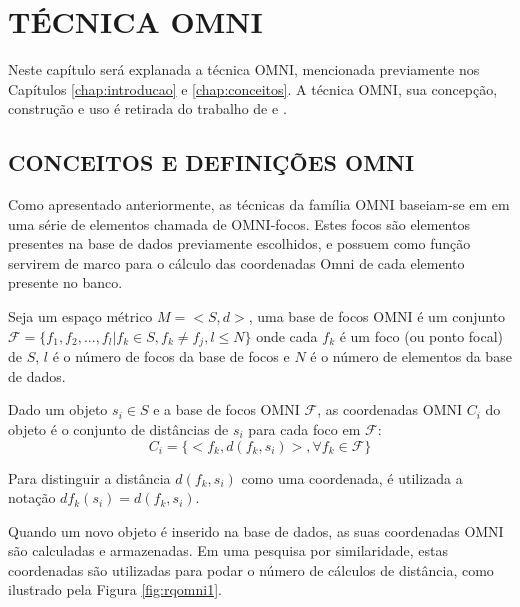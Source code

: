 \chapter{TÉCNICA OMNI}
\label{chap:omni}

Neste capítulo será explanada a técnica OMNI, mencionada previamente nos Capítulos \ref{chap:introducao} e \ref{chap:conceitos}.
A técnica OMNI, sua concepção, construção e uso é retirada do trabalho de \cite{Traina2001} e \cite{Traina2007}.


\section{CONCEITOS E DEFINIÇÕES OMNI}
\label{sec:defomni}
Como apresentado anteriormente, as técnicas da família OMNI baseiam-se em em uma série de elementos chamada de 
OMNI-focos. Estes focos são elementos presentes na base de dados previamente escolhidos, e possuem como função 
servirem de marco para o cálculo das coordenadas Omni de cada elemento presente no banco.

\begin{mydef}
 \label{def:omnifoco}
 Seja um espaço métrico $M = <S,d>$, uma base de focos OMNI é um conjunto 
 $\mathscr{F} = \{f_1, f_2, ..., f_l | f_k \in S, f_k \neq f_j, l \leq N \}$ onde cada $f_k$ é um foco
 (ou ponto focal) de $S$, $l$ é o número de focos da base de focos e $N$ é o número de elementos da base de dados.
\end{mydef}

\begin {mydef}
 \label{def:omnicoord}
 Dado um objeto $s_i \in S$ e a base de focos OMNI $\mathscr{F}$, as coordenadas OMNI $C_i$ do objeto é o conjunto
 de distâncias de $s_i$ para cada foco em $\mathscr{F}$:
 \begin{equation}
  C_i = \{ <f_k, d(f_k, s_i)>, \forall f_k \in \mathscr{F} \}
 \end{equation}
\end {mydef}

Para distinguir a distância $d(f_k, s_i)$ como uma coordenada, é utilizada a notação $df_k(s_i) = d(f_k, s_i)$.\par
Quando um novo objeto é inserido na base de dados, as suas coordenadas OMNI são calculadas e armazenadas. Em uma pesquisa por
similaridade, estas coordenadas são utilizadas para podar o número de cálculos de distância, como ilustrado pela Figura \ref{fig:rqomni1}.\par


